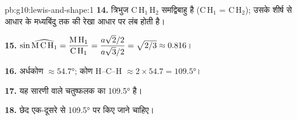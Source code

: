 \begin{solution}{pb:g10:lewis-and-shape:1}
\textbf{14.} त्रिभुज C\,H$_1$\,H$_2$ समद्विबाहु है (C\,H$_1$ = C\,H$_2$);
उसके शीर्ष से आधार के मध्यबिंदु तक की रेखा आधार पर
लंब होती है।

\textbf{15.} $\sin \widehat{\text{M\,C\,H}_1} = \dfrac{\text{M\,H}_1}{\text{C\,H}_1}
= \dfrac{a\sqrt{2}/2}{a\sqrt{3}/2} = \sqrt{2/3} \approx 0.816$।

\textbf{16.} अर्धकोण $\approx \ang{54.7}$; कोण H--C--H $\approx
2 \times 54.7 = \ang{109.5}$।

\textbf{17.} यह सारणी वाले चतुष्फलक का \ang{109.5} है।

\textbf{18.} छेद एक-दूसरे से \ang{109.5} पर किए जाने चाहिए।
\end{solution}
